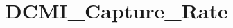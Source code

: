 \hypertarget{group___d_c_m_i___capture___rate}{\section{D\-C\-M\-I\-\_\-\-Capture\-\_\-\-Rate}
\label{group___d_c_m_i___capture___rate}
}
